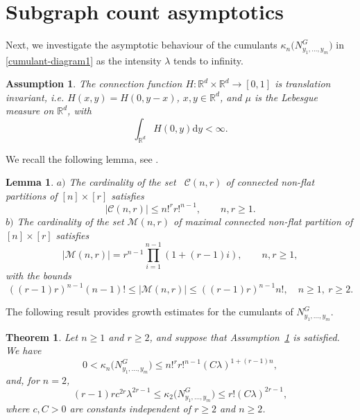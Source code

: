 \documentclass[12pt]{article}
\newtheorem{assumption}{Assumption}[section]
\newcommand{\R}{\mathbb{R}}
\newtheorem{lemma}[prop]{Lemma}
\newtheorem{thm}[prop]{Theorem}
\def\real{{\mathord{\mathbb R}}}
\numberwithin{equation}{section}
\begin{document}
\section{Subgraph count asymptotics} 
\label{sca}
\noindent
 Next, we investigate the asymptotic behaviour of the cumulants
$\kappa_n\big(N_{y_1,\ldots , y_m}^G\big)$ in \eqref{cumulant-diagram1} as the intensity $\lambda$ tends to infinity. 
 \begin{assumption}
   \label{a1} 
 The connection function 
 $H:\R^d\times \R^d\to[0,1]$
 is translation invariant,
 i.e. $H(x,y) = H(0,y-x)$,
 $x,y \in \real^d$,
 and $\mu$ is the Lebesgue
 measure on $\real^d$, with
 $$
 \int_{\real^d} H(0,y) \mathrm{d}y < \infty.
 $$ 
\end{assumption} 
 We recall the following lemma, see \cite[Lemma~2.6]{LiuPrivault}.
\begin{lemma}
  \noindent
  $a)$ The cardinality of the set \ $\mathcal{C} (n,r)$
 of connected non-flat partitions of $[n]\times[r]$ satisfies 
 \begin{equation}
   \label{coeff-0}
  |\mathcal{C} (n,r) | \leq n!^r r!^{n-1}, 
  \qquad n,r \geq 1. 
\end{equation}
\noindent
$b)$ 
 The cardinality of the set 
$ \mathcal{M}(n,r)$
 of maximal connected non-flat partition of $[n]\times[r]$ satisfies 
 \begin{equation}
   \nonumber %
  |\mathcal{M}(n,r)|=r^{n-1}\prod_{i=1}^{n-1}(1+(r-1)i),
  \qquad n,r\geq 1, 
\end{equation}
 with the bounds 
\begin{equation}\label{coeff-1}
    ( (r-1)r )^{n-1}(n-1)!\leq 
    |\mathcal{M}(n,r)|
     \leq ( (r-1)r )^{n-1}n!, \quad n\geq 1, \ r\geq 2. 
\end{equation}
\end{lemma}
The following result provides
growth estimates for the cumulants of $N^G_{y_1,\ldots , y_m}$. 
\begin{thm}
\label{khopone}
Let $n\geq 1$ and $r\geq 2$, and suppose
that Assumption~\ref{a1} is satisfied.
 We have
  \begin{equation}
\label{onefixed-1}
    0<\kappa_n\big( N_{y_1,\ldots , y_m}^G \big)\leq
    n!^r r!^{n-1}
   (C \lambda )^{1+(r-1)n}
    ,
\end{equation}
and, for $n=2$, 
\begin{equation}
\label{onefixed-2}
  (r-1)r
  c^{2r}
  \lambda^{2r-1} 
  \leq \kappa_2\big(N_{y_1,\ldots , y_m}^G\big)
 \leq 
  r!
  ( C \lambda )^{2r-1}, 
\end{equation}
 where $c, C>0$ are constants independent of $r\geq 2$ and $n \geq 2$.
\end{thm}
\end{document}
